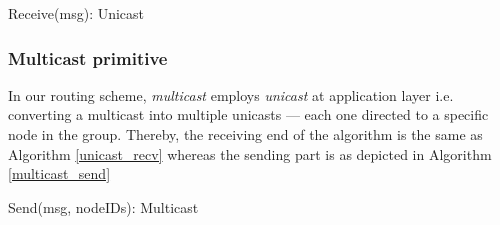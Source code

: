 \begin{algorithm}
\caption{Receive(msg): Unicast} 
\label{unicast_recv}
\DontPrintSemicolon
{}
\end{algorithm}


\subsubsection{Multicast primitive}

In our routing scheme,  \emph{multicast} employs \emph{unicast} at application layer i.e. converting a multicast into multiple unicasts --- each one directed to a specific node in the group. Thereby, the receiving end of the algorithm is the same as Algorithm \ref{unicast_recv} whereas the sending part is as depicted in Algorithm \ref{multicast_send} 

\begin{algorithm}
\caption{Send(msg, nodeIDs): Multicast} 
\label{multicast_send}
\DontPrintSemicolon
{}
\end{algorithm}
